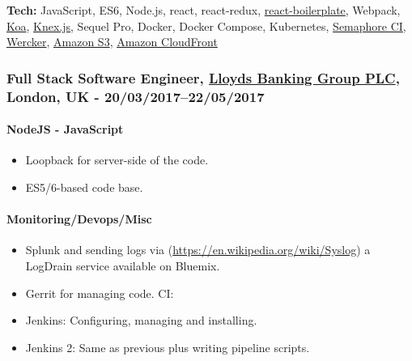 \documentclass[
  a4paper,
  8pt,
]{article}
\providecommand{\tightlist}{%
  \setlength{\itemsep}{0pt}\setlength{\parskip}{0pt}}
\begin{document}
\begin{multicols}{2}
\textbf{Tech:} JavaScript, ES6, Node.js, react, react-redux,
\href{https://www.reactboilerplate.com/}{react-boilerplate}, Webpack,
\href{http://koajs.com}{Koa}, \href{http://knexjs.org/}{Knex.js}, Sequel
Pro, Docker, Docker Compose, Kubernetes,
\href{https://semaphoreci.com}{Semaphore CI},
\href{http://www.wercker.com/}{Wercker},
\href{https://aws.amazon.com/s3/}{Amazon S3},
\href{http://aws.amazon.com/cloudfront/}{Amazon CloudFront}

\hypertarget{full-stack-software-engineer-lloyds-banking-group-plc-london-uk---2003201722052017}{%
\subsubsection{\texorpdfstring{Full Stack Software Engineer,
\href{https://www.lloydsbankinggroup.com}{Lloyds Banking Group PLC},
London, UK -
20/03/2017--22/05/2017}{Full Stack Software Engineer, Lloyds Banking Group PLC, London, UK - 20/03/2017--22/05/2017}}\label{full-stack-software-engineer-lloyds-banking-group-plc-london-uk---2003201722052017}}

\hypertarget{nodejs---javascript}{%
\paragraph{NodeJS - JavaScript}\label{nodejs---javascript}}

\begin{itemize}
\tightlist
\item
  Loopback for server-side of the code.
\item
  ES5/6-based code base.
\end{itemize}

\hypertarget{monitoringdevopsmisc}{%
\paragraph{Monitoring/Devops/Misc}\label{monitoringdevopsmisc}}

\begin{itemize}
\tightlist
\item
  Splunk and sending logs via
  (\url{https://en.wikipedia.org/wiki/Syslog}) a LogDrain service
  available on Bluemix.
\item
  Gerrit for managing code. CI:
\item
  Jenkins: Configuring, managing and installing.
\item
  Jenkins 2: Same as previous plus writing pipeline scripts.
\end{itemize}


\end{multicols}
\end{document}
